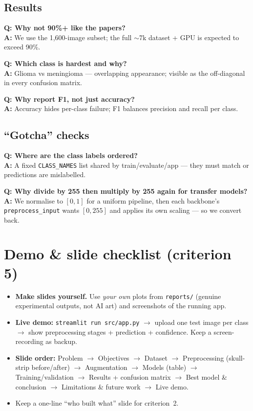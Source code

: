 \documentclass[11pt,a4paper]{article}
\newcommand{\code}[1]{\colorbox{codebg}{\small\texttt{#1}}}
\newcommand{\Q}[1]{\textbf{\color{navy}Q: #1}\\}
\newcommand{\A}[1]{\textbf{\color{ok}A:} #1}
\begin{document}
\subsection*{Results}
\begin{qabox}
\Q{Why not 90\%+ like the papers?}
\A{We use the 1{,}600-image subset; the full $\sim$7k dataset + GPU is expected to exceed 90\%.}
\end{qabox}
\begin{qabox}
\Q{Which class is hardest and why?}
\A{Glioma vs meningioma --- overlapping appearance; visible as the off-diagonal in every confusion matrix.}
\end{qabox}
\begin{qabox}
\Q{Why report F1, not just accuracy?}
\A{Accuracy hides per-class failure; F1 balances precision and recall per class.}
\end{qabox}

\subsection*{``Gotcha'' checks}
\begin{qabox}
\Q{Where are the class labels ordered?}
\A{A fixed \code{CLASS\_NAMES} list shared by train/evaluate/app --- they must match or predictions are mislabelled.}
\end{qabox}
\begin{qabox}
\Q{Why divide by 255 then multiply by 255 again for transfer models?}
\A{We normalise to $[0,1]$ for a uniform pipeline, then each backbone's \code{preprocess\_input} wants $[0,255]$ and applies its own scaling --- so we convert back.}
\end{qabox}

\section{Demo \& slide checklist (criterion 5)}
\begin{itemize}[leftmargin=*,itemsep=1pt]
  \item \textbf{Make slides yourself.} Use \emph{your own} plots from \code{reports/} (genuine experimental outputs, not AI art) and screenshots of the running app.
  \item \textbf{Live demo:} \code{streamlit run src/app.py} $\rightarrow$ upload one test image per class $\rightarrow$ show preprocessing stages + prediction + confidence. Keep a screen-recording as backup.
  \item \textbf{Slide order:} Problem $\rightarrow$ Objectives $\rightarrow$ Dataset $\rightarrow$ Preprocessing (skull-strip before/after) $\rightarrow$ Augmentation $\rightarrow$ Models (table) $\rightarrow$ Training/validation $\rightarrow$ Results + confusion matrix $\rightarrow$ Best model \& conclusion $\rightarrow$ Limitations \& future work $\rightarrow$ Live demo.
  \item Keep a one-line ``who built what'' slide for criterion~2.
\end{itemize}
\end{document}
